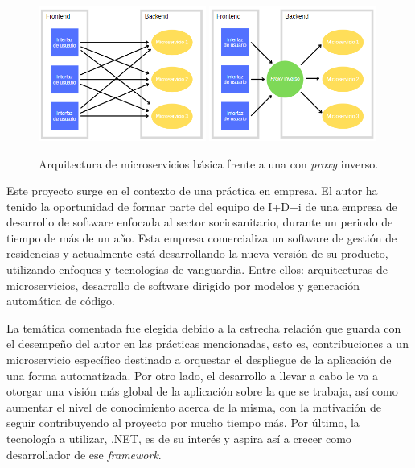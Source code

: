 \documentclass[11pt,spanish,listoffigures]{tfgetsinf}
\begin{document}
\begin{figure}[ht]
\centering
\includegraphics[width=0.49\textwidth]{imagenes/arquitecturaMicroserviciosBasica}
\includegraphics[width=0.49\textwidth]{imagenes/arquitecturaMicroserviciosConProxyInverso}
\caption{Arquitectura de microservicios básica frente a una con \emph{proxy} inverso.}
	\label{proxyInversoContraNoProxyInverso}
\end{figure}

Este proyecto surge en el contexto de una práctica en empresa. El autor ha tenido la oportunidad de formar parte del equipo de I+D+i de una empresa de desarrollo de software enfocada al sector sociosanitario, durante un periodo de tiempo de más de un año. Esta empresa comercializa un software de gestión de residencias y actualmente está desarrollando la nueva versión de su producto, utilizando enfoques y tecnologías de vanguardia. Entre ellos: arquitecturas de microservicios, desarrollo de software dirigido por modelos y generación automática de código.

La temática comentada fue elegida debido a la estrecha relación que guarda con el desempeño del autor en las prácticas mencionadas, esto es, contribuciones a un microservicio específico destinado a orquestar el despliegue de la aplicación de una forma automatizada. Por otro lado, el desarrollo a llevar a cabo le va a otorgar una visión más global de la aplicación sobre la que se trabaja, así como aumentar el nivel de conocimiento acerca de la misma, con la motivación de seguir contribuyendo al proyecto por mucho tiempo más. Por último, la tecnología a utilizar, .NET, es de su interés y aspira así a crecer como desarrollador de ese \emph{framework}.
\end{document}
